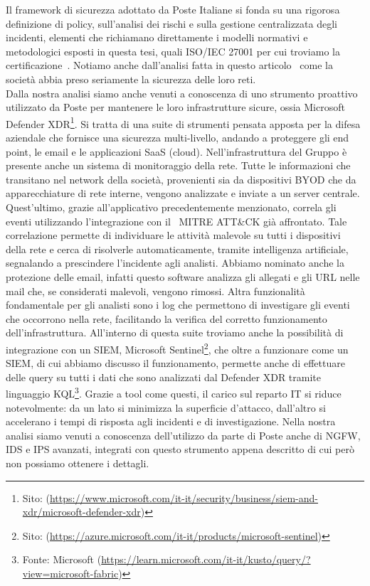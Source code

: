         Il framework di sicurezza adottato da Poste Italiane si fonda su una rigorosa definizione di policy, sull'analisi dei rischi e sulla gestione centralizzata degli incidenti, elementi che richiamano direttamente i modelli normativi e metodologici esposti in questa tesi, quali ISO/IEC 27001 per cui troviamo la certificazione~\cite{poste_iso_27001}. Notiamo anche dall'analisi fatta in questo articolo~\cite{poste_articolo_cyber} come la società abbia preso seriamente la sicurezza delle loro reti.\\
        Dalla nostra analisi siamo anche venuti a conoscenza di uno strumento proattivo utilizzato da Poste per mantenere le loro infrastrutture sicure, ossia Microsoft Defender XDR\footnote{Sito: (\url{https://www.microsoft.com/it-it/security/business/siem-and-xdr/microsoft-defender-xdr})}. Si tratta di una suite di strumenti pensata apposta per la difesa aziendale che fornisce una sicurezza multi-livello, andando a proteggere gli end point, le email e le applicazioni SaaS (cloud).
        Nell'infrastruttura del Gruppo è presente anche un sistema di monitoraggio della rete. Tutte le informazioni che transitano nel network della società, provenienti sia da dispositivi BYOD che da apparecchiature di rete interne, vengono analizzate e inviate a un server centrale. Quest'ultimo, grazie all'applicativo precedentemente menzionato, correla gli eventi utilizzando l'integrazione con il ~MITRE ATT\&CK già affrontato. Tale correlazione permette di individuare le attività malevole su tutti i dispositivi della rete e cerca di risolverle automaticamente, tramite intelligenza artificiale, segnalando a prescindere l'incidente agli analisti. Abbiamo nominato anche la protezione delle email, infatti questo software analizza gli allegati e gli URL nelle mail che, se considerati malevoli, vengono rimossi.
        Altra funzionalità fondamentale per gli analisti sono i log che permettono di investigare gli eventi che occorrono nella rete, facilitando la verifica del corretto funzionamento dell'infrastruttura.
        All'interno di questa suite troviamo anche la possibilità di integrazione con un SIEM, Microsoft Sentinel\footnote{Sito: (\url{https://azure.microsoft.com/it-it/products/microsoft-sentinel})}, che oltre a funzionare come un SIEM, di cui abbiamo discusso il funzionamento, permette anche di effettuare delle query su tutti i dati che sono analizzati dal Defender XDR tramite linguaggio KQL\footnote{Fonte: Microsoft (\url{https://learn.microsoft.com/it-it/kusto/query/?view=microsoft-fabric})}.
        Grazie a tool come questi, il carico sul reparto IT si riduce notevolmente: da un lato si minimizza la superficie d'attacco, dall'altro si accelerano i tempi di risposta agli incidenti e di investigazione.  Nella nostra analisi siamo venuti a conoscenza dell'utilizzo da parte di Poste anche di NGFW, IDS e IPS avanzati, integrati con questo strumento appena descritto di cui però non possiamo ottenere i dettagli.

       